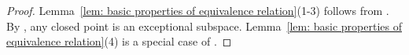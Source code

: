 \documentclass[11pt]{amsart}
\numberwithin{equation}{section}
\newcommand\luo[1]{\todo[color=red!40]{#1}} %
\newcommand{\Cc}{\mathbb{C}}
\newcommand{\fm}{\mathfrak{m}}
\newcommand{\Spec}{\operatorname{Spec}}
\newtheorem{lem}[thm]{Lemma}
\theoremstyle{definition}
\theoremstyle{definition}
\begin{document}
\begin{proof}
Lemma~\ref{lem: basic properties of equivalence relation}(1-3) follows from \cite[p~322~Remark]{HR64}. By \cite[Definition 3]{Gra62}, any closed point is an exceptional subspace. Lemma~\ref{lem: basic properties of equivalence relation}(4) is a special case of \cite[p~314~Theorem]{HR64}.
\end{proof}

\end{document}
